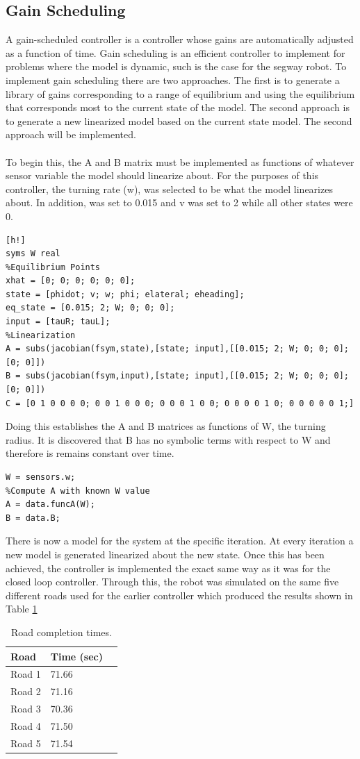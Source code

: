 \documentclass[12pt]{article}
\begin{document}
\subsection{Gain Scheduling}
A gain-scheduled controller is a controller whose gains are automatically adjusted as a function of time. Gain scheduling is an efficient controller to implement for problems where the model is dynamic, such is the case for the segway robot. To implement gain scheduling there are two approaches. The first is to generate a library of gains corresponding to a range of equilibrium and using the equilibrium that corresponds most to the current state of the model. The second approach is to generate a new linearized model based on the current state model. The second approach will be implemented.
\\ \\
To begin this, the A and B matrix must be implemented as functions of whatever sensor variable the model should linearize about. For the purposes of this controller, the turning rate (w), was selected to be what the model linearizes about. In addition, \dot{\phi} was set to 0.015 and v was set to 2 while all other states were 0. 
\begin{lstlisting}[h!]
syms W real
%Equilibrium Points
xhat = [0; 0; 0; 0; 0; 0];
state = [phidot; v; w; phi; elateral; eheading];
eq_state = [0.015; 2; W; 0; 0; 0];
input = [tauR; tauL];
%Linearization
A = subs(jacobian(fsym,state),[state; input],[[0.015; 2; W; 0; 0; 0]; [0; 0]])
B = subs(jacobian(fsym,input),[state; input],[[0.015; 2; W; 0; 0; 0]; [0; 0]])
C = [0 1 0 0 0 0; 0 0 1 0 0 0; 0 0 0 1 0 0; 0 0 0 0 1 0; 0 0 0 0 0 1;]
\end{lstlisting}
Doing this establishes the A and B matrices as functions of W, the turning radius. It is discovered that B has no symbolic terms with respect to W and therefore is remains constant over time.
\begin{lstlisting}[frame=single]
%Define Variable
W = sensors.w;
%Compute A with known W value
A = data.funcA(W);
B = data.B;
\end{lstlisting}
There is now a model for the system at the specific iteration. At every iteration a new model is generated linearized about the new state. Once this has been achieved, the controller is implemented the exact same way as it was for the closed loop controller. Through this, the robot was simulated on the same five different roads used for the earlier controller which produced the results shown in Table \ref{roadTimesGain}
\begin{table}[h!]
\centering
\begin{tabular}{|p{4cm}|p{4cm}|p{4cm}|}
\hline
Road & Time (sec)\\
\hline \hline
Road 1 & 71.66\\
Road 2 &  71.16\\
Road 3 & 70.36\\ 
Road 4 & 71.50\\ 
Road 5 & 71.54\\
\hline
\end{tabular}
\caption{Road completion times.\label{roadTimesGain}}
\end{table}
\end{document}
